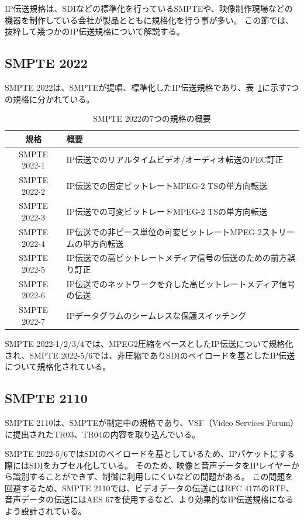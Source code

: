 IP伝送規格は、SDIなどの標準化を行っているSMPTEや、映像制作現場などの機器を制作している会社が製品とともに規格化を行う事が多い。
この節では、抜粋して幾つかのIP伝送規格について解説する。

\subsection{SMPTE 2022}
SMPTE 2022\cite{smpte-2022}は、SMPTEが提唱、標準化したIP伝送規格であり、表~\ref{tb:smpte2022-abstract}に示す7つの規格に分かれている。

\begin{table}[htbp]
  \caption{SMPTE 2022の7つの規格の概要}
  \label{tb:smpte2022-abstract}
  \begin{center}
  \begin{tabular}{c|l}
    \hline
    規格          & 概要 \\\hline\hline
    SMPTE 2022-1 & IP伝送でのリアルタイムビデオ/オーディオ転送のFEC訂正 \\\hline
    SMPTE 2022-2 & IP伝送での固定ビットレートMPEG-2 TSの単方向転送 \\\hline
    SMPTE 2022-3 & IP伝送での可変ビットレートMPEG-2 TSの単方向転送 \\\hline
    SMPTE 2022-4 & IP伝送での非ピース単位の可変ビットレートMPEG-2ストリームの単方向転送 \\\hline
    SMPTE 2022-5 & IP伝送での高ビットレートメディア信号の伝送のための前方誤り訂正 \\\hline
    SMPTE 2022-6 & IP伝送でのネットワークを介した高ビットレートメディア信号の伝送 \\\hline
    SMPTE 2022-7 & IPデータグラムのシームレスな保護スイッチング \\\hline
  \end{tabular}\end{center}
\end{table}

SMPTE 2022-1/2/3/4では、MPEG2圧縮をベースとしたIP伝送について規格化され、SMPTE 2022-5/6では、非圧縮でありSDIのペイロードを基としたIP伝送について規格化されている。

\newpage
\subsection{SMPTE 2110}
SMPTE 2110\cite{smpte-2110}は、SMPTEが制定中の規格であり、VSF（Video Services Forum）に提出されたTR03、TR04の内容を取り込んでいる。

SMPTE 2022-5/6ではSDIのペイロードを基としているため、IPパケットにする際にはSDIをカプセル化している。
そのため、映像と音声データをIPレイヤーから識別することができず、制御に利用しにくいなどの問題がある。
この問題を回避するため、SMPTE 2110では、ビデオデータの伝送にはRFC 4175\cite{rfc4175}のRTP、音声データの伝送にはAES 67を使用するなど、より効果的なIP伝送規格になるよう設計されている。

